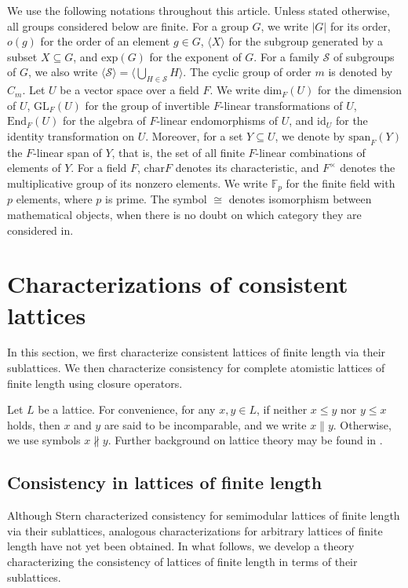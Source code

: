 \documentclass[12pt]{article}
\begin{document}
We use the following notations throughout this article. Unless stated otherwise, all groups considered below are finite. For a group $G$, we write $|G|$ for its order, $o(g)$ for the order of an element $g\in G$, $\langle X\rangle$ for the subgroup generated by a subset $X\subseteq G$, and $\mbox{exp}(G)$ for the exponent of $G$.
For a family $\mathcal{S}$ of subgroups of $G$, we also write
$\langle\mathcal{S}\rangle=\langle\bigcup_{H\in\mathcal{S}}H\rangle.$
The cyclic group of order $m$ is denoted by $C_m$. Let $U$ be a vector space over a field $F$. We write $\mbox{dim}_F(U)$ for the dimension of $U$, $\mbox{GL}_{F}(U)$ for the group of invertible $F$-linear transformations of $U$, $\mbox{End}_{F}(U)$ for the algebra of $F$-linear endomorphisms of $U$, and $\mbox{id}_U$ for the identity transformation on $U$. Moreover, for a set $Y\subseteq U$, we denote by $\mbox{span}_{F}(Y)$ the $F$-linear span of $Y$, that is, the set of all finite $F$-linear combinations of elements of $Y$. For a field $F$, $\mbox{char} F$ denotes its characteristic, and $F^\times$ denotes the multiplicative group of its nonzero elements. We write $\mathbb{F}_p$ for the finite field with $p$ elements, where $p$ is prime. The symbol $\cong$ denotes isomorphism between mathematical objects, when there is no doubt on which category they are considered in. 


\section{Characterizations of consistent lattices}
In this section, we first characterize consistent lattices of finite length via their sublattices. We then characterize consistency for complete atomistic lattices of finite length using closure operators. 

Let $L$ be a lattice. For convenience, for any $x, y\in L$, if neither $x\leq y$ nor $y\leq x$ holds, then $x$ and $y$ are said to be incomparable, and we write $x\parallel y$. Otherwise, we use symbols $x\nparallel y$. Further background on lattice theory may be found in \cite{Crawley73,Birkhoff73,Davey,Stern99}.
\subsection{Consistency in lattices of finite length}
Although Stern \cite{Stern99} characterized consistency for semimodular lattices of finite length via their sublattices, analogous characterizations 
for arbitrary lattices of finite length have not yet been obtained. 
In what follows, we develop a theory characterizing the consistency 
of lattices of finite length in terms of their sublattices.
\end{document}
